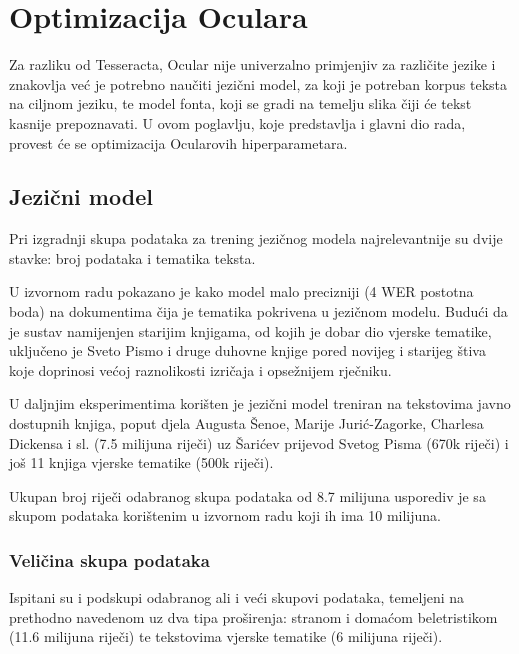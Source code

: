 \documentclass[zavrsnirad]{fer}
\begin{document}
\chapter{Optimizacija Oculara}
\label{pog:optimizacija_oculara}

Za razliku od Tesseracta, Ocular nije univerzalno primjenjiv za različite jezike i znakovlja već je potrebno naučiti jezični model, za koji je potreban korpus teksta na ciljnom jeziku, te model fonta, koji se gradi na temelju slika čiji će tekst kasnije prepoznavati. U ovom poglavlju, koje predstavlja i glavni dio rada, provest će se optimizacija Ocularovih hiperparametara.

\section{Jezični model}

Pri izgradnji skupa podataka za trening jezičnog modela najrelevantnije su dvije stavke: broj podataka i tematika teksta.

U izvornom radu pokazano je kako model malo precizniji (4 WER postotna boda) na dokumentima čija je tematika pokrivena u jezičnom modelu. Budući da je sustav namijenjen starijim knjigama, od kojih je dobar dio vjerske tematike, uključeno je Sveto Pismo i druge duhovne knjige pored novijeg i starijeg štiva koje doprinosi većoj raznolikosti izričaja i opsežnijem rječniku.
\cite{Berg2013}

U daljnjim eksperimentima korišten je jezični model treniran na tekstovima javno dostupnih knjiga, poput djela Augusta Šenoe, Marije Jurić-Zagorke, Charlesa Dickensa i sl. (7.5 milijuna riječi) uz Šarićev prijevod Svetog Pisma (670k riječi) i još 11 knjiga vjerske tematike (500k riječi). 

Ukupan broj riječi odabranog skupa podataka od 8.7 milijuna usporediv je sa skupom podataka korištenim u izvornom radu koji ih ima 10 milijuna.

\subsection{Veličina skupa podataka}

Ispitani su i podskupi odabranog ali i veći skupovi podataka, temeljeni na prethodno navedenom uz dva tipa proširenja: stranom i domaćom beletristikom (11.6 milijuna riječi) te tekstovima vjerske tematike (6 milijuna riječi). 
\end{document}
